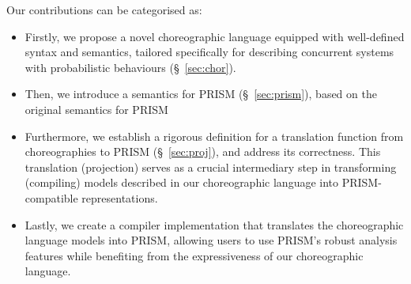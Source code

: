  Our contributions can be
categorised as:
\begin{itemize} 
\item Firstly, we propose a novel choreographic language equipped with
  well-defined syntax and semantics, tailored specifically for
  describing concurrent systems with probabilistic behaviours
  (\S~\ref{sec:chor}).
\item Then, we introduce a semantics for PRISM (\S~\ref{sec:prism}),
  based on the original semantics for PRISM~\cite{PRISMdoc}
\item Furthermore, we establish a rigorous definition for a
  translation function from choreographies to PRISM
  (\S~\ref{sec:proj}), and address its correctness. This translation
  (projection) serves as a crucial intermediary step in transforming
  (compiling) models described in our choreographic language into
  PRISM-compatible representations.
\item Lastly, we create a compiler implementation that translates the
  choreographic language models into PRISM, allowing users to use
  PRISM's robust analysis features while benefiting from the
  expressiveness of our choreographic language.
\end{itemize}



